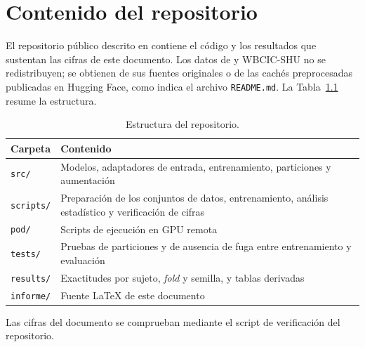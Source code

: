 \chapter{Contenido del repositorio}
\label{anx:repositorio}

El repositorio público descrito en \cite{ayala2026repo} contiene el código y los resultados que sustentan las cifras de este documento. Los datos de \openbmi{} y WBCIC-SHU no se redistribuyen; se obtienen de sus fuentes
originales o de las cachés preprocesadas publicadas en Hugging Face, como indica el archivo
\texttt{README.md}. La Tabla~\ref{tab:repositorio} resume la estructura.

\begin{table}[htbp]
\centering
\caption{Estructura del repositorio.}
\label{tab:repositorio}
\begin{tabular}{p{}p{}}
\hline
Carpeta & Contenido \\
\hline
\texttt{src/} & Modelos, adaptadores de entrada, entrenamiento, particiones y aumentación \\
\texttt{scripts/} & Preparación de los conjuntos de datos, entrenamiento, análisis estadístico y verificación de cifras \\
\texttt{pod/} & Scripts de ejecución en GPU remota \\
\texttt{tests/} & Pruebas de particiones y de ausencia de fuga entre entrenamiento y evaluación \\
\texttt{results/} & Exactitudes por sujeto, \textit{fold} y semilla, y tablas derivadas \\
\texttt{informe/} & Fuente \LaTeX{} de este documento \\
\hline
\end{tabular}
\end{table}

Las cifras del documento se comprueban mediante el script de verificación del repositorio.

